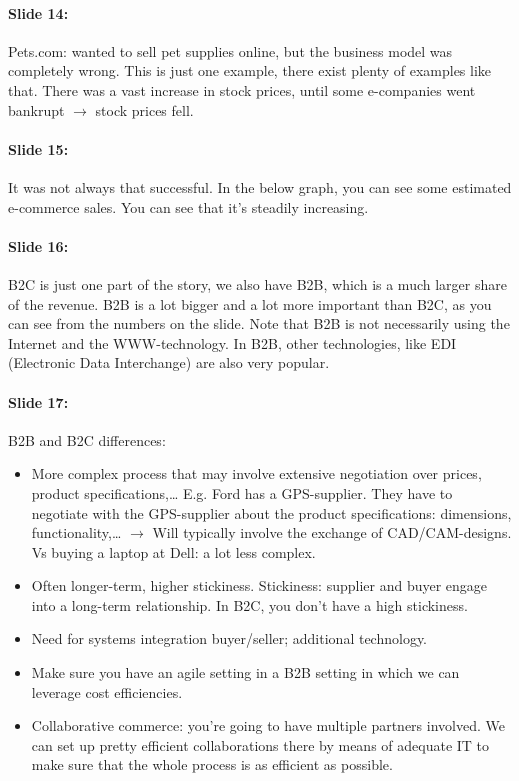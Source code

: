 \documentclass[10pt,a4paper]{report}
\begin{document}
\paragraph{Slide 14:}Pets.com: wanted to sell pet supplies online, but the business model was completely wrong. This is just one example, there exist plenty of examples like that. There was a vast increase in stock prices, until some e-companies went bankrupt $\rightarrow$ stock prices fell.

\paragraph{Slide 15:}It was not always that successful. In the below graph, you can see some estimated e-commerce sales. You can see that it's steadily increasing.

\paragraph{Slide 16:}B2C is just one part of the story, we also have B2B, which is a much larger share of the revenue. B2B is a lot bigger and a lot more important than B2C, as you can see from the numbers on the slide. Note that B2B is not necessarily using the Internet and the WWW-technology. In B2B, other technologies, like EDI (Electronic Data Interchange) are also very popular.

\paragraph{Slide 17:}B2B and B2C differences:
\begin{itemize}
\item More complex process that may involve extensive negotiation over prices, product specifications,… E.g. Ford has a GPS-supplier. They have to negotiate with the GPS-supplier about the product specifications: dimensions, functionality,… $\rightarrow$ Will typically involve the exchange of CAD/CAM-designs. Vs buying a laptop at Dell: a lot less complex.
\item Often longer-term, higher stickiness. Stickiness: supplier and buyer engage into a long-term relationship. In B2C, you don't have a high stickiness.
\item Need for systems integration buyer/seller; additional technology.
\item Make sure you have an agile setting in a B2B setting in which we can leverage cost efficiencies. 
\item Collaborative commerce: you're going to have multiple partners involved. We can set up pretty efficient collaborations there by means of adequate IT to make sure that the whole process is as efficient as possible. 
\end{itemize}
\end{document}
